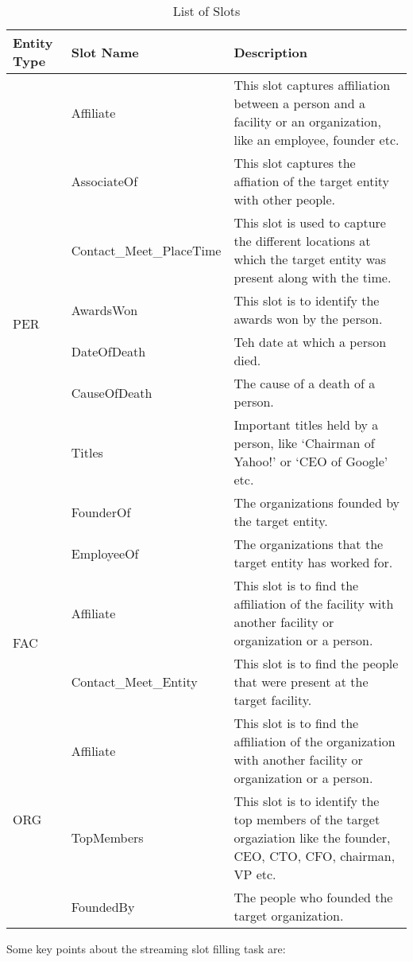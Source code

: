 \begin{table}[h]
\caption{List of Slots}
\label{tab:slots}
\begin{tabular}{ |p{1cm}|p{4cm}|p{10cm}| }
\hline
\textbf{Entity Type} & \textbf{Slot Name} & \textbf{Description} \\
\hline
\multirow{9}{*}{PER} & Affiliate & This slot captures affiliation between a person and a facility or an organization, like an employee, founder etc. \\ 
 & AssociateOf & This slot captures the affiation of the target entity with other people. \\
 & Contact\_Meet\_PlaceTime & This slot is used to capture the different locations at which the target entity was present along with the time. \\
 & AwardsWon & This slot is to identify the awards won by the person. \\ 
 & DateOfDeath & Teh date at which a person died. \\ 
 & CauseOfDeath & The cause of a death of a person. \\ 
 & Titles & Important titles held by a person, like ‘Chairman of Yahoo!’ or ‘CEO of Google’ etc. \\ 
 & FounderOf & The organizations founded by the target entity. \\ 
 & EmployeeOf & The organizations that the target entity has worked for. \\ \hline
\multirow{2}{*}{FAC} & Affiliate & This slot is to find the affiliation of the facility with another facility or organization or a person. \\
 & Contact\_Meet\_Entity & This slot is to find the people that were present at the target facility. \\
\multirow{3}{*}{ORG} & Affiliate & This slot is to find the affiliation of the organization with another facility or organization or a person. \\
 & TopMembers & This slot is to identify the top members of the target orgaziation like the founder, CEO, CTO, CFO, chairman, VP etc. \\
 & FoundedBy & The people who founded the target organization. \\ \hline
\end{tabular}
\end{table}
Some key points about the streaming slot filling task are:
